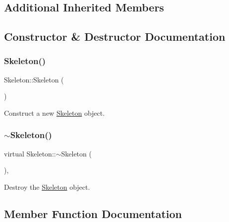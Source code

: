 \subsection*{Additional Inherited Members}


\subsection{Constructor \& Destructor Documentation}
\mbox{\label{classSkeleton_af01a02f1ce9ae4c801cd6e66ccf7407f}} 
\subsubsection{\texorpdfstring{Skeleton()}{Skeleton()}}
{\footnotesize\ttfamily Skeleton\+::\+Skeleton (\begin{DoxyParamCaption}{ }\end{DoxyParamCaption})}



Construct a new \mbox{\hyperlink{classSkeleton}{Skeleton}} object. 

\mbox{\label{classSkeleton_ae6a32fa46fd502bc2f6c2cfafff24003}} 
\subsubsection{\texorpdfstring{$\sim$Skeleton()}{~Skeleton()}}
{\footnotesize\ttfamily virtual Skeleton\+::$\sim$\+Skeleton (\begin{DoxyParamCaption}{ }\end{DoxyParamCaption})\hspace{0.3cm}{\ttfamily [virtual]}, {\ttfamily [default]}}



Destroy the \mbox{\hyperlink{classSkeleton}{Skeleton}} object. 



\subsection{Member Function Documentation}
\mbox{\label{classSkeleton_aefa4683beb507bafaa2b20eaba4f478d}} 

